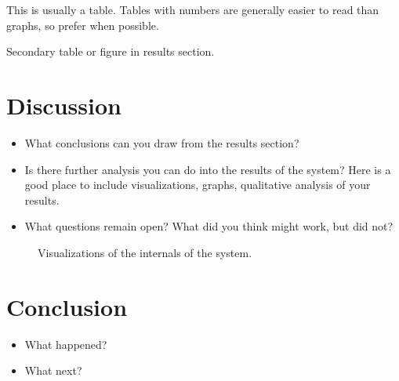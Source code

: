 \documentclass{article}
\begin{document}
\begin{table}
  \centering
  \missingfigure{}
  \caption{This is usually a table. Tables with numbers are generally easier to read than graphs, so prefer when possible.}
  \label{fig:mainres}
\end{table}


\begin{table}
  \centering
  \missingfigure[figheight=5cm]{}
  \caption{Secondary table or figure in results section.}
  \label{fig:mainres}
\end{table}

\lipsum[7-11]

\section{Discussion}



\begin{itemize}
\item What conclusions can you draw from the results section?
\item Is there further analysis you can do into the results of the system? Here is a good place to include visualizations, graphs, qualitative analysis of your results.

\item  What questions remain open? What did you think might work, but did not?
\end{itemize}

\lipsum[4-8]

\begin{figure}
  \centering
  \missingfigure{}
  \missingfigure{}
  \missingfigure{}
  \caption{Visualizations of the internals of the system.}
\end{figure}

\section{Conclusion}

\begin{itemize}
\item What happened?
\item What next?
\end{itemize}

\lipsum[4-6]







\end{document}
